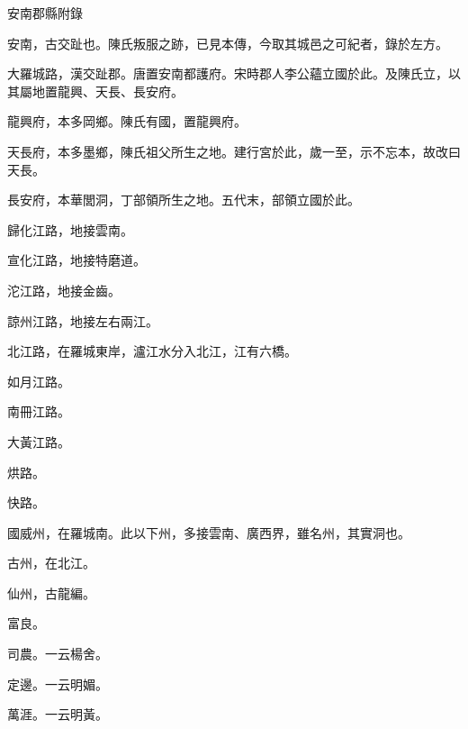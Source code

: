 \begin{pinyinscope}
 安南郡縣附錄



 安南，古交趾也。陳氏叛服之跡，已見本傳，今取其城邑之可紀者，錄於左方。



 大羅城路，漢交趾郡。唐置安南都護府。宋時郡人李公蘊立國於此。及陳氏立，以其屬地置龍興、天長、長安府。



 龍興府，本多岡鄉。陳氏有國，置龍興府。



 天長府，本多墨鄉，陳氏祖父所生之地。建行宮於此，歲一至，示不忘本，故改曰天長。



 長安府，本華閭洞，丁部領所生之地。五代末，部領立國於此。



 歸化江路，地接雲南。



 宣化江路，地接特磨道。



 沱江路，地接金齒。



 諒州江路，地接左右兩江。



 北江路，在羅城東岸，瀘江水分入北江，江有六橋。



 如月江路。



 南冊江路。



 大黃江路。



 烘路。



 快路。



 國威州，在羅城南。此以下州，多接雲南、廣西界，雖名州，其實洞也。



 古州，在北江。



 仙州，古龍編。



 富良。



 司農。一云楊舍。



 定邊。一云明媚。



 萬涯。一云明黃。




\end{pinyinscope}

